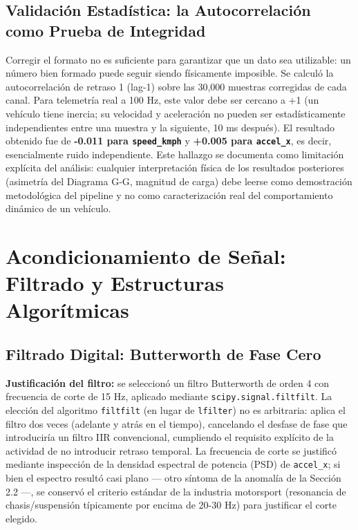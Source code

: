 \documentclass[12pt, letterpaper]{article}
\begin{document}
	\subsection{Validación Estadística: la Autocorrelación como Prueba de Integridad}
	Corregir el formato no es suficiente para garantizar que un dato sea utilizable: un número bien formado puede seguir siendo físicamente imposible. Se calculó la autocorrelación de retraso 1 (lag-1) sobre las 30,000 muestras corregidas de cada canal. Para telemetría real a 100 Hz, este valor debe ser cercano a +1 (un vehículo tiene inercia; su velocidad y aceleración no pueden ser estadísticamente independientes entre una muestra y la siguiente, 10 ms después). El resultado obtenido fue de \textbf{-0.011 para \texttt{speed\_kmph}} y \textbf{+0.005 para \texttt{accel\_x}}, es decir, esencialmente ruido independiente. Este hallazgo se documenta como limitación explícita del análisis: cualquier interpretación física de los resultados posteriores (asimetría del Diagrama G-G, magnitud de carga) debe leerse como demostración metodológica del pipeline y no como caracterización real del comportamiento dinámico de un vehículo.
	
	\section{Acondicionamiento de Señal: Filtrado y Estructuras Algorítmicas}
	
	\subsection{Filtrado Digital: Butterworth de Fase Cero}
	\textbf{Justificación del filtro:} se seleccionó un filtro Butterworth de orden 4 con frecuencia de corte de 15 Hz, aplicado mediante \texttt{scipy.signal.filtfilt}. La elección del algoritmo \texttt{filtfilt} (en lugar de \texttt{lfilter}) no es arbitraria: aplica el filtro dos veces (adelante y atrás en el tiempo), cancelando el desfase de fase que introduciría un filtro IIR convencional, cumpliendo el requisito explícito de la actividad de no introducir retraso temporal. La frecuencia de corte se justificó mediante inspección de la densidad espectral de potencia (PSD) de \texttt{accel\_x}; si bien el espectro resultó casi plano — otro síntoma de la anomalía de la Sección 2.2 —, se conservó el criterio estándar de la industria motorsport (resonancia de chasis/suspensión típicamente por encima de 20-30 Hz) para justificar el corte elegido.
	
\end{document}
